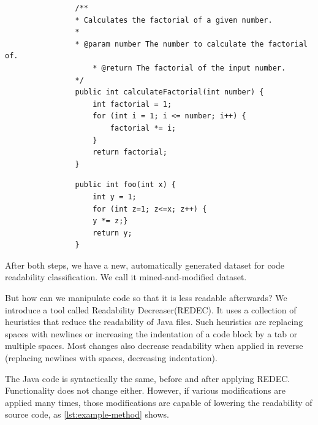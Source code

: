 \documentclass[%
class=scrreprt,
chapterprefix=false,%
open=right,%
twoside=false,%
paper=a4,%
logofile={Logo\_zentral\_farbig\_EN.png},%
thesistype=master,%
UKenglish,%
]{se2thesis}
\theoremstyle{definition}
\newcommand{\RDH}{Readability Decreaser\xspace}
\newcommand{\rdh}{REDEC\xspace}
\newcommand{\RDHa}{\RDH (\rdh)\xspace} %
\begin{document}
	\begin{listing}[tb]
		\begin{sublisting}{\linewidth}
			\begin{verbatim}
				/**
				* Calculates the factorial of a given number.
				*
				* @param number The number to calculate the factorial of.
					* @return The factorial of the input number.
				*/
				public int calculateFactorial(int number) {
					int factorial = 1;
					for (int i = 1; i <= number; i++) {
						factorial *= i;
					}
					return factorial;
				}
			\end{verbatim}
			\caption{An example of a simple and well readable Java method.}
			\label{lst:example-method-well}
		\end{sublisting}		
		\begin{sublisting}{\linewidth}
			\begin{verbatim}
				public int foo(int x) {
					int y = 1;
					for (int z=1; z<=x; z++) {
					y *= z;}
					return y;
				}
			\end{verbatim}
			\caption{The same example as in \autoref{lst:example-method-well} but modified for poor readability.}
			\label{lst:example-method-badly}
		\end{sublisting}
		\caption{Well readable (\autoref{lst:example-method-well}) vs. poorly readable (\autoref{lst:example-method-badly}) code.}
		\label{lst:example-method}
	\end{listing}
	
	After both steps, we have a new, automatically generated dataset for code readability classification. We call it mined-and-modified dataset.
	
	But how can we manipulate code so that it is less readable afterwards? We introduce a tool called \RDHa. It uses a collection of heuristics that reduce the readability of Java files. Such heuristics are replacing spaces with newlines or increasing the indentation of a code block by a tab or multiple spaces. Most changes also decrease readability when applied in reverse (replacing newlines with spaces, decreasing indentation).
	
	The Java code is syntactically the same, before and after applying \rdh. Functionality does not change either. However, if various modifications are applied many times, those modifications are capable of lowering the readability of source code, as \autoref{lst:example-method} shows.
\end{document}
